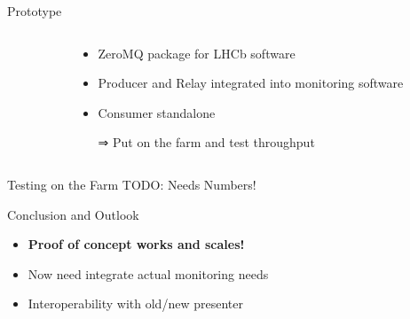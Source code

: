 \documentclass[aspectratio=1610,compress,titleprogressbar]{beamer}
\begin{document}
\begin{frame}{Prototype}
  \begin{columns}
    \begin{column}{.5\textwidth}
    \end{column}
    \begin{column}{.5\textwidth}
      \begin{itemize}
        \item ZeroMQ package for LHCb software
        \item Producer and Relay integrated into monitoring software
        \item Consumer standalone
        \item [] {}
        \item [⇒] Put on the farm and test throughput
      \end{itemize}
    \end{column}
  \end{columns}
\end{frame}

\begin{frame}{Testing on the Farm}
  \Huge TODO: Needs Numbers!
\end{frame}

\begin{frame}{Conclusion and Outlook}
  \begin{itemize}
    \item \textbf{Proof of concept works and scales!}
    \item [] {}
    \item Now need integrate actual monitoring needs
    \item Interoperability with old/new presenter
  \end{itemize}
\end{frame}
\end{document}
